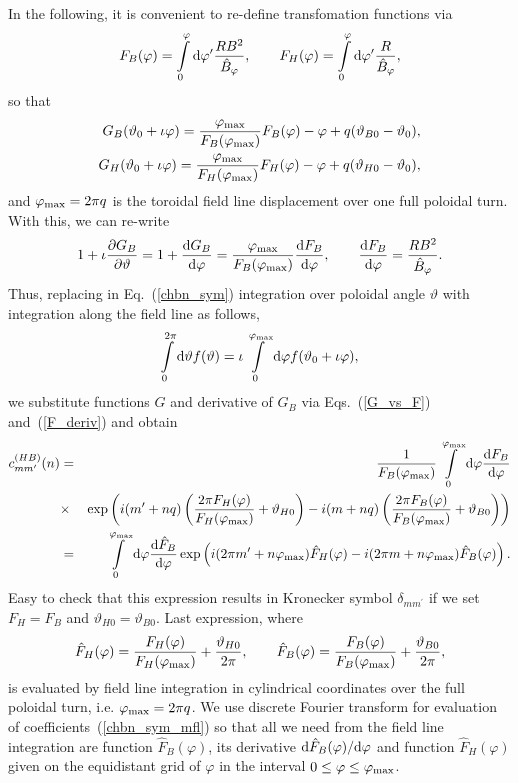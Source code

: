 \documentclass[12pt]{article}
\newcommand{\be}[1]{\begin{equation} \label{#1}}
\newcommand{\ee}{\end{equation}}
\newcommand{\bea}[1]{\begin{eqnarray} \label{#1}}
\newcommand{\eea}{\end{eqnarray}}
\newcommand{\eq}[1]{(\ref{#1})}
\newcommand{\difp}[2]{\frac{\partial #1}{\partial #2}}
\newcommand{\rd}{{\rm d}}
\begin{document}
In the following, it is convenient to re-define transfomation functions via
\be{redef_via_F}
F_B(\varphi)=\int\limits_0^\varphi\rd\varphi^\prime \frac{R B^2}{\hat B_\varphi},
\qquad
F_H(\varphi)=\int\limits_0^\varphi\rd\varphi^\prime \frac{R}{\hat B_\varphi},
\ee
so that
\bea{G_vs_F}
G_B(\vartheta_0+\iota\varphi)=\frac{\varphi_{\rm max}}{F_B(\varphi_{\rm max})}F_B(\varphi)-\varphi+q(\vartheta_{B0}-\vartheta_0),
\nonumber \\
G_H(\vartheta_0+\iota\varphi)=\frac{\varphi_{\rm max}}{F_H(\varphi_{\rm max})}F_H(\varphi)-\varphi+q(\vartheta_{H0}-\vartheta_0),
\eea
and $\varphi_{\rm max} = 2\pi q$ is the toroidal field line displacement over one full poloidal turn.
With this, we can re-write
\be{F_deriv}
1+\iota \difp{G_B}{\vartheta}=1+\frac{\rd G_B}{\rd\varphi}
=\frac{\varphi_{\rm max}}{F_B(\varphi_{\rm max})} \frac{\rd F_B}{\rd\varphi},
\qquad
\frac{\rd F_B}{\rd\varphi}=\frac{R B^2}{\hat B_\varphi}.
\ee
Thus, replacing in Eq.~\eq{chbn_sym} integration over poloidal angle $\vartheta$ with integration along the field line as follows,
$$
\int\limits_{0}^{2\pi}\rd \vartheta f(\vartheta) 
= 
\iota\int\limits_{0}^{\varphi_{\rm max}}\rd \varphi f(\vartheta_0 + \iota \varphi),
$$
we substitute functions $G$ and derivative of $G_B$ via Eqs.~\eq{G_vs_F} and~\eq{F_deriv} and obtain
\bea{chbn_sym_mfl}
c_{mm^\prime}^{(HB)}(n)
&=&
\frac{1}{F_B(\varphi_{\rm max})} 
\int\limits_{0}^{\varphi_{\rm max}}\rd \varphi
\frac{\rd F_B}{\rd\varphi}
\nonumber \\
&\times&
\exp
\left(
i(m^\prime+nq)\left(\frac{2\pi F_H(\varphi)}{F_H(\varphi_{\rm max})}+\vartheta_{H0}\right)
-
i(m+nq)\left(\frac{2\pi F_B(\varphi)}{F_B(\varphi_{\rm max})}+\vartheta_{B0}\right)
\right)
\nonumber \\
&=&
\int\limits_{0}^{\varphi_{\rm max}}\rd \varphi
\frac{\rd \hat F_B}{\rd\varphi}
\exp
\left(
i(2\pi m^\prime+n\varphi_{\rm max})\hat F_H(\varphi)
-
i(2\pi m+n\varphi_{\rm max})\hat F_B(\varphi)
\right).
\eea
Easy to check that this expression results in Kronecker symbol $\delta_{mm^\prime}$ 
if we set $F_H=F_B$ and $\vartheta_{H0}=\vartheta_{B0}$.
Last expression, where
\be{hat_Fs}
\hat F_H(\varphi) = \frac{F_H(\varphi)}{F_H(\varphi_{\rm max})}+\frac{\vartheta_{H0}}{2\pi},
\qquad
\hat F_B(\varphi) = \frac{F_B(\varphi)}{F_B(\varphi_{\rm max})}+\frac{\vartheta_{B0}}{2\pi},
\ee
is evaluated by field line integration in cylindrical coordinates over the full poloidal
turn, i.e. $\varphi_{\rm max}=2\pi q$. We use discrete Fourier transform for evaluation of 
coefficients~\eq{chbn_sym_mfl} so that all we need from the field line integration are function
$\hat F_B(\varphi)$, its derivative $\rd \hat F_B(\varphi) /\rd \varphi$ and function $\hat F_H(\varphi)$
given on the equidistant grid of $\varphi$ in the interval $0 \le \varphi \le \varphi_{\rm max}$.
\end{document}

